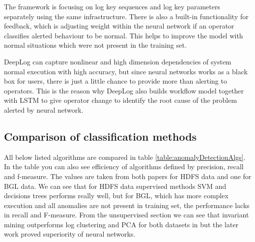 The framework is focusing on log key sequences and log key parameters separately using the same infrastructure. There is also a built-in functionality for feedback, which is adjusting weight within the neural network if an operator classifies alerted behaviour to be normal. This helps to improve the model with normal situations which were not present in the training set.

DeepLog can capture nonlinear and high dimension dependencies of system normal execution with high accuracy, but since neural networks works as a black box for users, there is just a little chance to provide more than alerting to operators. This is the reason why DeepLog also builds workflow model together with LSTM to give operator change to identify the root cause of the problem alerted by neural network.

\subsection{Comparison of classification methods}

All below listed algorithms are compared in table \ref{table:anomalyDetectionAlgs}. In the table you can also see efficiency of algorithms defined by precision, recall and f-measure. The values are taken from both papers for HDFS data and one for BGL data. We can see that for HDFS data supervised methods SVM and decisions trees performs really well, but for BGL, which has more complex execution and all anomalies are not present in training set, the performance lacks in recall and F-measure. From the unsupervised section we can see that invariant mining outperforms log clustering and PCA for both datasets in \cite{he2016experience} but the later work proved superiority of neural networks.

